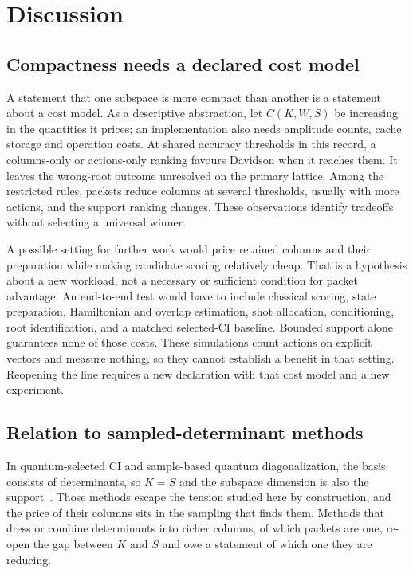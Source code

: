 \documentclass[aps,pra,reprint,superscriptaddress,nofootinbib,floatfix,
  showkeys,raggedbottom]{revtex4-2}
\begin{document}
\section{Discussion}
\label{sec:discussion}

\subsection{Compactness needs a declared cost model}

A statement that one subspace is more compact than another is a statement
about a cost model. As a descriptive abstraction, let $C(K,W,S)$ be increasing
in the quantities it prices; an implementation also needs amplitude counts,
cache storage and operation costs. At shared accuracy thresholds in this
record, a columns-only or actions-only ranking favours Davidson when it
reaches them. It leaves the wrong-root outcome unresolved on the primary
lattice. Among the restricted rules, packets reduce columns at several
thresholds, usually with more actions, and the support ranking changes.
These observations identify tradeoffs without selecting a universal winner.

A possible setting for further work would price retained columns and their
preparation while making candidate scoring relatively cheap. That is a
hypothesis about a new workload, not a necessary or sufficient condition for
packet advantage. An end-to-end test would have to include classical scoring,
state preparation, Hamiltonian and overlap estimation, shot allocation,
conditioning, root identification, and a matched selected-CI baseline.
Bounded support alone guarantees none of those costs. These simulations count
actions on explicit vectors and measure nothing, so they cannot establish a
benefit in that setting. Reopening the line requires a new declaration with
that cost model and a new experiment.

\subsection{Relation to sampled-determinant methods}

In quantum-selected CI and sample-based quantum diagonalization, the basis
consists of determinants, so $K=S$ and the subspace dimension is also the
support~\cite{kanno2026qsci,robledomoreno2025sqd}. Those methods escape the
tension studied here by construction, and the price of their columns sits in
the sampling that finds them. Methods that dress or combine determinants into
richer columns, of which packets are one, re-open the gap between $K$ and $S$
and owe a statement of which one they are reducing.
\end{document}
